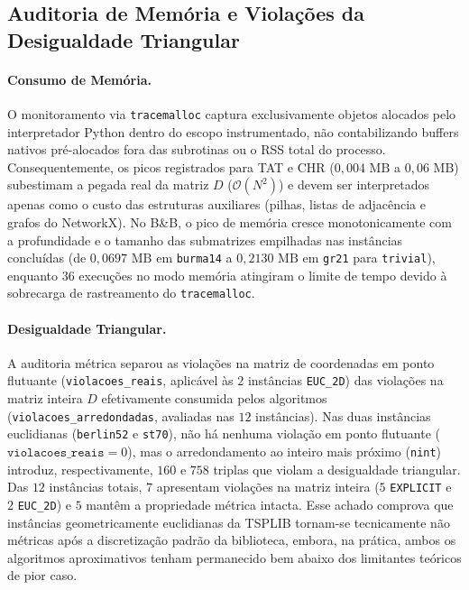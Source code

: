 \documentclass[12pt]{article}
\begin{document}
\subsection{Auditoria de Memória e Violações da Desigualdade Triangular}
\label{sec:violacoes}

\paragraph{Consumo de Memória.} O monitoramento via \texttt{tracemalloc} captura exclusivamente objetos alocados pelo interpretador Python dentro do escopo instrumentado, não contabilizando buffers nativos pré-alocados fora das subrotinas ou o RSS total do processo. Consequentemente, os picos registrados para TAT e CHR ($0{,}004\text{ MB}$ a $0{,}06\text{ MB}$) subestimam a pegada real da matriz $D$ ($\mathcal{O}(N^2)$) e devem ser interpretados apenas como o custo das estruturas auxiliares (pilhas, listas de adjacência e grafos do NetworkX). No B\&B, o pico de memória cresce monotonicamente com a profundidade e o tamanho das submatrizes empilhadas nas instâncias concluídas (de $0{,}0697\text{ MB}$ em \texttt{burma14} a $0{,}2130\text{ MB}$ em \texttt{gr21} para \texttt{trivial}), enquanto $36$ execuções no modo memória atingiram o limite de tempo devido à sobrecarga de rastreamento do \texttt{tracemalloc}.

\paragraph{Desigualdade Triangular.} A auditoria métrica separou as violações na matriz de coordenadas em ponto flutuante (\texttt{violacoes\_reais}, aplicável às $2$ instâncias \texttt{EUC\_2D}) das violações na matriz inteira $D$ efetivamente consumida pelos algoritmos (\texttt{violacoes\_arredondadas}, avaliadas nas $12$ instâncias). Nas duas instâncias euclidianas (\texttt{berlin52} e \texttt{st70}), não há nenhuma violação em ponto flutuante ($\texttt{violacoes\_reais} = 0$), mas o arredondamento ao inteiro mais próximo (\texttt{nint}) introduz, respectivamente, $160$ e $758$ triplas que violam a desigualdade triangular. Das $12$ instâncias totais, $7$ apresentam violações na matriz inteira ($5$ \texttt{EXPLICIT} e $2$ \texttt{EUC\_2D}) e $5$ mantêm a propriedade métrica intacta. Esse achado comprova que instâncias geometricamente euclidianas da TSPLIB tornam-se tecnicamente não métricas após a discretização padrão da biblioteca, embora, na prática, ambos os algoritmos aproximativos tenham permanecido bem abaixo dos limitantes teóricos de pior caso.
\end{document}
